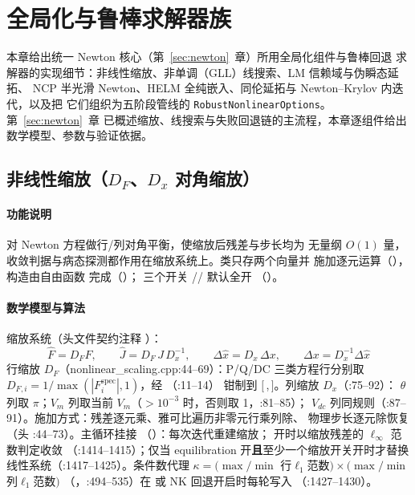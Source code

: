 \section{全局化与鲁棒求解器族}\label{sec:robust}

本章给出统一 Newton 核心（第~\ref{sec:newton}~章）所用全局化组件与鲁棒回退
求解器的实现细节：非线性缩放、非单调（GLL）线搜索、LM 信赖域与伪瞬态延拓、
NCP 半光滑 Newton、HELM 全纯嵌入、同伦延拓与 Newton--Krylov 内迭代，以及把
它们组织为五阶段管线的 \texttt{RobustNonlinearOptions}。第~\ref{sec:newton}~章
已概述缩放、线搜索与失败回退链的主流程，本章逐组件给出数学模型、参数与验证依据。

\subsection{非线性缩放（$D_F$、$D_x$ 对角缩放）}\label{sec:robust:scaling}

\paragraph{功能说明} 对 Newton 方程做行/列对角平衡，使缩放后残差与步长均为
无量纲 $O(1)$ 量，收敛判据与病态探测都作用在缩放系统上。类只存两个向量并
施加逐元运算（），构造由自由函数
 完成（）；
三个开关 //
 默认全开
（）。
\paragraph{数学模型与算法} 缩放系统（头文件契约注释
）：
\[
\hat F=D_F F,\qquad \hat J=D_F\,J\,D_x^{-1},\qquad
\Delta\hat x=D_x\,\Delta x,\qquad \Delta x=D_x^{-1}\Delta\hat x
\]
行缩放 $D_F$（nonlinear\_scaling.cpp:44--69）：P/Q/DC 三类方程行分别取
$D_{F,i}=1/\max(|F_i^{\mathrm{spec}}|,1)$，经 （:11--14）
钳制到 $[\,$,$\,]$。列缩放 $D_x$（:75--92）：
$\theta$ 列取 $\pi$；$V_m$ 列取当前 $V_m$（$>10^{-3}$ 时，否则取 1，:81--85）；
$V_{dc}$ 列同规则（:87--91）。施加方式：残差逐元乘、雅可比遍历非零元行乘列除、
物理步长逐元除恢复（头 :44--73）。主循环挂接
（）：每次迭代重建缩放；
 开时以缩放残差的 $\ell_\infty$ 范数判定收敛
（:1414--1415）；仅当 equilibration 开\textbf{且}至少一个缩放开关开时才替换
线性系统（:1417--1425）。条件数代理
$\kappa=(\max/\min$ 行$\ell_1$范数$)\times(\max/\min$ 列$\ell_1$范数$)$
（，:494--535）在
 或 NK 回退开启时每轮写入
（:1427--1430）。
